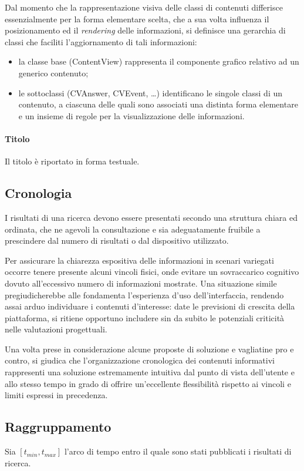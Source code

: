 Dal momento che la rappresentazione visiva delle classi di contenuti differisce essenzialmente per la forma elementare scelta, che a sua volta influenza il posizionamento ed il \textit{rendering} delle informazioni, si definisce una gerarchia di classi che faciliti l'aggiornamento di tali informazioni:
\begin{itemize}
  \item la classe base (\textsf{ContentView}) rappresenta il componente grafico relativo ad un generico contenuto;
  \item le sottoclassi (\textsf{CVAnswer}, \textsf{CVEvent}, \ldots) identificano le singole classi di un contenuto, a ciascuna delle quali sono associati una distinta forma elementare e un insieme di regole per la visualizzazione delle informazioni.
\end{itemize}

\paragraph{Titolo}
Il titolo è riportato in forma testuale.

\pagebreak
\subsection{Cronologia}
I risultati di una ricerca devono essere presentati secondo una struttura chiara ed ordinata, che ne agevoli la consultazione e sia adeguatamente fruibile a prescindere dal numero di risultati o dal dispositivo utilizzato.

Per assicurare la chiarezza espositiva delle informazioni in scenari variegati occorre tenere presente alcuni vincoli fisici, onde evitare un sovraccarico cognitivo dovuto all'eccessivo numero di informazioni mostrate. Una situazione simile pregiudicherebbe alle fondamenta l'esperienza d'uso dell'interfaccia, rendendo assai arduo individuare i contenuti d'interesse: date le previsioni di crescita della piattaforma, si ritiene opportuno includere sin da subito le potenziali criticità nelle valutazioni progettuali.

Una volta prese in considerazione alcune proposte di soluzione e vagliatine pro e contro, si giudica che l'organizzazione cronologica dei contenuti informativi rappresenti una soluzione estremamente intuitiva dal punto di vista dell'utente e allo stesso tempo in grado di offrire un'eccellente flessibilità rispetto ai vincoli e limiti espressi in precedenza.

\subsection{Raggruppamento}
Sia $[t_{min}, t_{max}]$ l'arco di tempo entro il quale sono stati pubblicati i risultati di ricerca.

